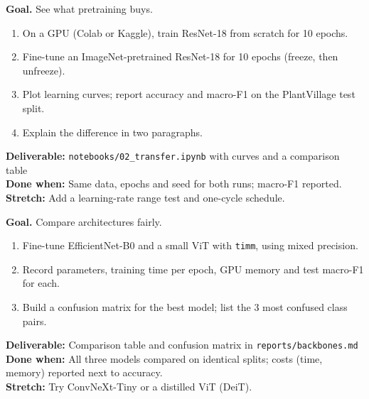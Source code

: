 \begin{tcolorbox}[enhanced,breakable,colback=white,colframe=sun,boxrule=0.8pt,arc=2pt,left=7pt,right=7pt,top=4pt,bottom=4pt,
  title={\bfseries Tuesday --- Transfer learning versus training from scratch\hfill\normalfont\small 3 h},coltitle=white,colbacktitle=sun,fonttitle=\small]
\textbf{Goal.} See what pretraining buys.
\begin{enumerate}[itemsep=1pt,topsep=2pt]
  \item On a GPU (Colab or Kaggle), train ResNet-18 from scratch for 10 epochs.
  \item Fine-tune an ImageNet-pretrained ResNet-18 for 10 epochs (freeze, then unfreeze).
  \item Plot learning curves; report accuracy and macro-F1 on the PlantVillage test split.
  \item Explain the difference in two paragraphs.
\end{enumerate}
\textbf{\color{dataC}Deliverable:} \texttt{notebooks/02\_transfer.ipynb} with curves and a comparison table\\
\textbf{\color{navy}Done when:} Same data, epochs and seed for both runs; macro-F1 reported.\\
\textbf{\color{skillC}Stretch:} Add a learning-rate range test and one-cycle schedule.
\end{tcolorbox}

\begin{tcolorbox}[enhanced,breakable,colback=white,colframe=sun,boxrule=0.8pt,arc=2pt,left=7pt,right=7pt,top=4pt,bottom=4pt,
  title={\bfseries Wednesday --- Modern backbones and mixed precision\hfill\normalfont\small 3 h},coltitle=white,colbacktitle=sun,fonttitle=\small]
\textbf{Goal.} Compare architectures fairly.
\begin{enumerate}[itemsep=1pt,topsep=2pt]
  \item Fine-tune EfficientNet-B0 and a small ViT with \texttt{timm}, using mixed precision.
  \item Record parameters, training time per epoch, GPU memory and test macro-F1 for each.
  \item Build a confusion matrix for the best model; list the 3 most confused class pairs.
\end{enumerate}
\textbf{\color{dataC}Deliverable:} Comparison table and confusion matrix in \texttt{reports/backbones.md}\\
\textbf{\color{navy}Done when:} All three models compared on identical splits; costs (time, memory) reported next to accuracy.\\
\textbf{\color{skillC}Stretch:} Try ConvNeXt-Tiny or a distilled ViT (DeiT).
\end{tcolorbox}

